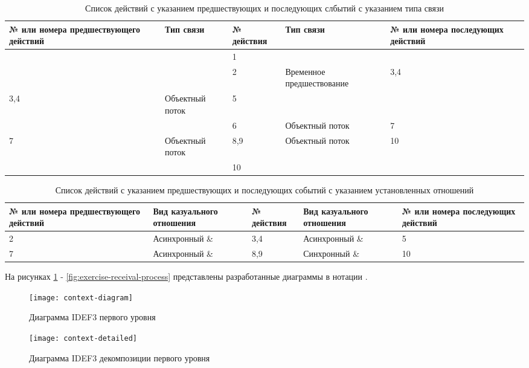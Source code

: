 \documentclass[a4paper,14pt]{extarticle}
\begin{document}
\begin{table}[H]
    \caption{Список действий с указанием предшествующих и последующих слбытий с указанием типа связи}
    \begin{tabular}{| p{3cm} | p{3cm} | p{3cm} | p{3cm} | p{3cm} |}
        \hline
        № или номера предшествующего действий & Тип связи & № действия & Тип связи & № или номера последующих действий \\ \hline
         & & 1 & & \\ \hline
         & & 2 & Временное предшествование & 3,4 \\ \hline
         3,4 & Объектный поток & 5 & & \\ \hline
         & & 6 & Объектный поток & 7 \\ \hline
         7 & Объектный поток & 8,9 & Объектный поток & 10 \\ \hline
         & & 10 & & \\ \hline
    \end{tabular}
\end{table}

\begin{table}[H]
    \caption{Список действий с указанием предшествующих и последующих событий с указанием установленных отношений}
    \begin{tabular}{| p{3cm} | p{3cm} | p{3cm} | p{3cm} | p{3cm} |}
        \hline
        № или номера предшествующего действий & Вид казуального отношения & № действия & Вид казуального отношения & № или номера последующих действий \\ \hline
        2 & Асинхронный \& & 3,4 & Асинхронный \& & 5 \\ \hline
        7 & Асинхронный \& & 8,9 & Синхронный \& & 10 \\ \hline
    \end{tabular}
\end{table}

На рисунках \ref{fig:context-diagram} - \ref{fig:exercise-receival-process}
представлены разработанные диаграммы в нотации .

\begin{figure}[H]
    \centering
    \texttt{[image: context-diagram]}
    \caption{Диаграмма IDEF3 первого уровня}
    \label{fig:context-diagram}
\end{figure}

\begin{figure}[H]
    \centering
    \texttt{[image: context-detailed]}
    \caption{Диаграмма IDEF3 декомпозиции первого уровня}
    \label{fig:context-detailed}
\end{figure}
\end{document}
